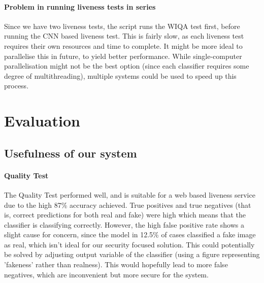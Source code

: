 \documentclass[10pt,a4paper]{article}
\begin{document}
        \paragraph{Problem in running liveness tests in series}
            Since we have two liveness tests, the script runs the WIQA test first, before running the CNN based liveness test. This is fairly slow, as each liveness test requires their
            own resources and time to complete. It might be more ideal to parallelise this in future, to yield better performance. While single-computer parallelisation might not be the best option
            (since each classifier requires some degree of multithreading), multiple systems could be used to speed up this process.

\section{Evaluation}
    \subsection{Usefulness of our system}
    
        \paragraph{Quality Test}
            The Quality Test performed well, and is suitable for a web based liveness service due to the high 87\% accuracy achieved.
            True positives and true negatives (that is, correct predictions for both real and fake) were high which means that the classifier
            is classifying correctly. However, the high false positive rate shows a slight cause for concern, since the model in 12.5\% of cases
            classified a fake image as real, which isn't ideal for our security focused solution. This could potentially be solved by adjusting output
            variable of the classifier (using a figure representing 'fakeness' rather than realness). This would hopefully lead to more false negatives,
            which are inconvenient but more secure for the system.
\end{document}

